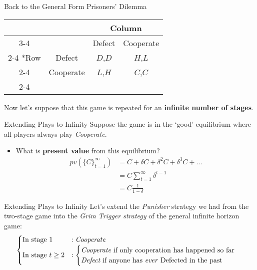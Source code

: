 \begin{frame}{Back to the General Form Prisoners' Dilemma}
  \begin{table}[!h]
    \centering
    \begin{tabular}{*{4}{c|}}
      \multicolumn{2}{c}{} & \multicolumn{2}{c}{Column} \\ \cline{3-4}
      \multicolumn{1}{c}{} &         & Defect  & Cooperate \\ \cline{2-4}
      \multirow{2}*{Row} &    Defect & $D$,$D$ & $H$,$L$   \\ \cline{2-4}
                         & Cooperate & $L$,$H$ & $C$,$C$   \\ \cline{2-4} 
    \end{tabular} 
  \end{table} 
  Now let's suppose that this game is repeated for an \textbf{infinite number of stages}.
\end{frame}

\begin{frame}{Extending Plays to Infinity}
  Suppose the game is in the `good' equilibrium where all players always play \textit{Cooperate}.
  \begin{itemize}
    \item What is \textbf{present value} from this equilibrium? 
    \begin{align*}
      pv\left(\{ C \}_{t=1}^{\infty}\right) & = C + \delta C + \delta^2 C + \delta^3 C + ... \\ 
         & = C \sum_{t=1}^{\infty} \delta^{t-1} \\
         & = C \frac{1}{1-\delta}
    \end{align*}
  \end{itemize}
\end{frame}

\begin{frame}{Extending Plays to Infinity}
   Let's extend the \textit{Punisher} strategy we had from the two-stage game 
   into the \textit{Grim Trigger strategy} of the general infinite horizon game:
  \begin{align*}
    \begin{cases}
      \text{In stage } 1 & : \textit{Cooperate} \\ 
      \text{In stage } t \geq 2 & : 
      \begin{cases}
        \textit{Cooperate} \text{  if only cooperation has happened so far} \\ 
        \textit{Defect} \text{  if anyone has \textit{ever} Defected in the past}
      \end{cases}
    \end{cases}
  \end{align*}
\end{frame}

